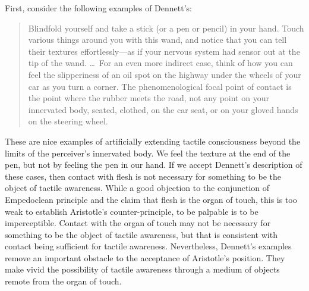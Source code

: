 First, consider the following examples of Dennett's:
\begin{quote}
    Blindfold yourself and take a stick (or a pen or pencil) in your hand. Touch various things around you with this wand, and notice that you can tell their textures effortlessly---as if your nervous system had sensor out at the tip of the wand. \ldots\ For an even more indirect case, think of how you can feel the slipperiness of an oil spot on the highway under the wheels of your car as you turn a corner. The phenomenological focal point of contact is the point where the rubber meets the road, not any point on your innervated body, seated, clothed, on the car seat, or on your gloved hands on the steering wheel. \citep[47]{Dennett:1993ce}
\end{quote}
These are nice examples of artificially extending tactile consciousness beyond the limits of the perceiver's innervated body. We feel the texture at the end of the pen, but not by feeling the pen in our hand. If we accept Dennett's description of these cases, then contact with flesh is not necessary for something to be the object of tactile awareness. While a good objection to the conjunction of Empedoclean principle and the claim that flesh is the organ of touch, this is too weak to establish Aristotle's counter-principle, to be palpable is to be imperceptible. Contact with the organ of touch may not be necessary for something to be the object of tactile awareness, but that is consistent with contact being sufficient for tactile awareness. Nevertheless, Dennett's examples remove an important obstacle to the acceptance of Aristotle's position. They make vivid the possibility of tactile awareness through a medium of objects remote from the organ of touch.

